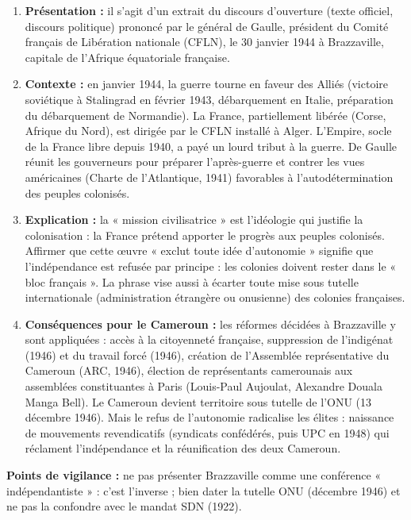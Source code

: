 \documentclass[11pt]{article}
\begin{document}
\begin{corrige}
\begin{enumerate}
\item \textbf{Présentation :} il s'agit d'un extrait du discours d'ouverture (texte officiel, discours politique) prononcé par le général de Gaulle, président du Comité français de Libération nationale (CFLN), le 30 janvier 1944 à Brazzaville, capitale de l'Afrique équatoriale française.
\item \textbf{Contexte :} en janvier 1944, la guerre tourne en faveur des Alliés (victoire soviétique à Stalingrad en février 1943, débarquement en Italie, préparation du débarquement de Normandie). La France, partiellement libérée (Corse, Afrique du Nord), est dirigée par le CFLN installé à Alger. L'Empire, socle de la France libre depuis 1940, a payé un lourd tribut à la guerre. De Gaulle réunit les gouverneurs pour préparer l'après-guerre et contrer les vues américaines (Charte de l'Atlantique, 1941) favorables à l'autodétermination des peuples colonisés.
\item \textbf{Explication :} la « mission civilisatrice » est l'idéologie qui justifie la colonisation : la France prétend apporter le progrès aux peuples colonisés. Affirmer que cette œuvre « exclut toute idée d'autonomie » signifie que l'indépendance est refusée par principe : les colonies doivent rester dans le « bloc français ». La phrase vise aussi à écarter toute mise sous tutelle internationale (administration étrangère ou onusienne) des colonies françaises.
\item \textbf{Conséquences pour le Cameroun :} les réformes décidées à Brazzaville y sont appliquées : accès à la citoyenneté française, suppression de l'indigénat (1946) et du travail forcé (1946), création de l'Assemblée représentative du Cameroun (ARC, 1946), élection de représentants camerounais aux assemblées constituantes à Paris (Louis-Paul Aujoulat, Alexandre Douala Manga Bell). Le Cameroun devient territoire sous tutelle de l'ONU (13 décembre 1946). Mais le refus de l'autonomie radicalise les élites : naissance de mouvements revendicatifs (syndicats confédérés, puis UPC en 1948) qui réclament l'indépendance et la réunification des deux Cameroun.
\end{enumerate}
\textbf{Points de vigilance :} ne pas présenter Brazzaville comme une conférence « indépendantiste » : c'est l'inverse ; bien dater la tutelle ONU (décembre 1946) et ne pas la confondre avec le mandat SDN (1922).
\end{corrige}
\end{document}
